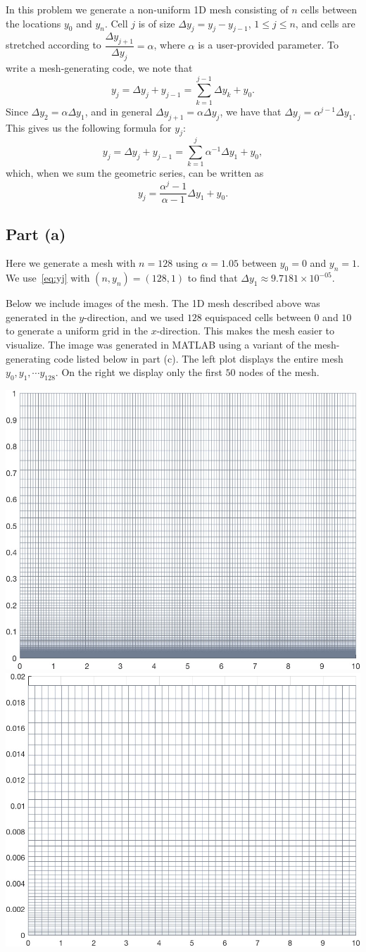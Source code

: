 \documentclass{article}
\begin{document}
In this problem we generate a non-uniform 1D mesh consisting of $n$ cells between the locations $y_0$ and $y_n$. Cell $j$ is of size $\Delta y_j = y_j-y_{j-1}$, $ 1\leq j \leq n$, and cells are stretched according to $\dfrac{\Delta y_{j+1}}{\Delta y_j}  =\alpha$, where $\alpha$ is a user-provided parameter. To write a mesh-generating code, we note that 
\[ y_j  = \Delta y_j + y_{j-1} = \sum_{k=1}^{j-1} \Delta y_k + y_0.\]
Since $\Delta y_2 = \alpha \Delta y_1$, and in general $\Delta y_{j+1} = \alpha  \Delta y_{j}$, we have that $\Delta y_{j} = \alpha^{j-1} \Delta y_1$. This gives us the following formula for $y_j$:
\[ y_j  = \Delta y_j + y_{j-1} = \sum_{k=1}^{j} \alpha^{-1} \Delta y_1 + y_0, \]
which, when we sum the geometric series, can be written as 
\begin{equation}
\label{eq:yj}
 y_j = \dfrac{\alpha^{j}-1}{\alpha -1} \Delta y_1 +y_0. 
\end{equation}

\subsection{Part (a)}
Here we generate a mesh with $n=128$ using $ \alpha = 1.05$ between $y_0 = 0$ and $y_n = 1$.  We use~\eqref{eq:yj} with $(n, y_n) = (128, 1)$ to find that $ \Delta y_1 \approx 9.7181 \times 10^{-05} $.  

Below we include images of the mesh. The 1D mesh described above was generated in the $y$-direction, and we used $128$ equispaced cells between $0$ and $10$ to generate a uniform grid in the $x$-direction. This makes the mesh easier to visualize. The image was generated in MATLAB using a variant of the mesh-generating code listed below in part (c).
The left plot displays the entire mesh $y_0, y_1, \cdots y_{128}$. On the right we display only the first $50$ nodes of the mesh. 

\vspace{1cm}

\includegraphics[width=.45\textwidth]{meshgrid.jpg} 
\includegraphics[width=.45\textwidth]{meshgrid_small.jpg} 
\end{document}
